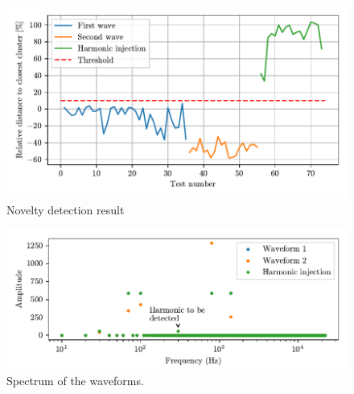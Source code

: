 \begin{figure}
    \centering
    \includegraphics{Images/shaker/Results.pdf}
    \caption{Novelty detection result}
    \label{fig:shaker_results}
\end{figure}

\begin{figure}
    \centering
    \includegraphics{Images/shaker/spectrum.pdf}
    \caption{Spectrum of the waveforms.}
    \label{fig:shaker_spectrum}
\end{figure}


